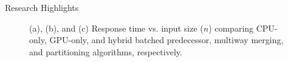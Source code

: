 \documentclass[final]{beamer}
\newlength{\colwidth}
\begin{document}
\begin{frame}[t]
\begin{columns}[t]
\begin{column}{\colwidth}
\begin{block}{Research Highlights}
 \begin{figure}[htp]
\centering
{}
    \caption{(a), (b), and (c) Response time vs. input size ($n$) comparing CPU-only, GPU-only, and hybrid batched predecessor, multiway merging, and partitioning algorithms, respectively.}
   \label{fig:predecessor_search_results}
\end{figure}
 



\end{block}
\end{column}
\end{columns}
\end{frame}
\end{document}
